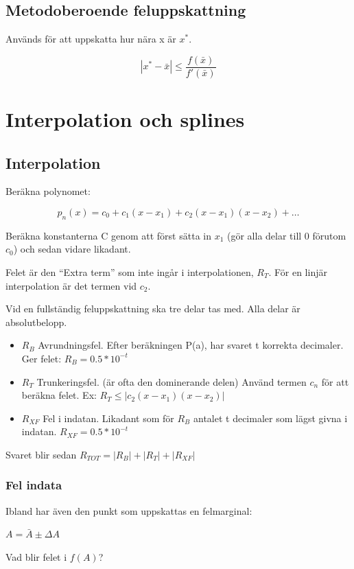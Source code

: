\documentclass[12pt,a4paper]{article}
\begin{document}
\subsection{Metodoberoende feluppskattning}
Används för att uppskatta hur nära x är $x^*$.

$$ |x^{*}-\bar{x}| \leq \frac{f(\bar{x})}{f'(\bar{x})} $$

\newpage
\section{Interpolation och splines}
\subsection{Interpolation}

Beräkna polynomet:

$$ p_n(x) = c_0 + c_1(x-x_1) + c_2 (x-x_1)(x-x_2) + \ldots $$

Beräkna konstanterna C genom att först sätta in $x_1$ (gör alla delar till 0 förutom $c_0$) och sedan vidare likadant.

Felet är den ``Extra term'' som inte ingår i interpolationen, $R_T$.
För en linjär interpolation är det termen vid $c_2$.

Vid en fullständig feluppskattning ska tre delar tas med.
Alla delar är absolutbelopp.

\begin{itemize}
\item{$R_B$ Avrundningsfel.
Efter beräkningen P(a), har svaret t korrekta decimaler. \\Ger felet: $ R_B = 0.5 * 10^{-t}$}
\item{$R_T$ Trunkeringsfel.
(är ofta den dominerande delen)
Använd termen $c_n$ för att beräkna felet.
Ex: $ R_T \leq |c_2 (x-x_1)(x-x_2)|$
}
\item{$R_{XF}$ Fel i indatan.
Likadant som för $R_B$ antalet t decimaler som lägst givna i indatan.
$R_{XF} = 0.5 * 10^{-t}$}
\end{itemize}

Svaret blir sedan $R_{TOT} = | R_B | + | R_T | + |R_{XF}| $

\subsubsection{Fel indata}
Ibland har även den punkt som uppskattas en felmarginal:

$A = \bar{A} \pm \Delta A $

Vad blir felet i $f(A)$?
\end{document}
